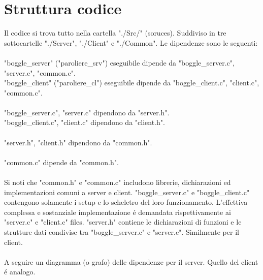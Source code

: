 \chapter{Struttura codice}

Il codice si trova tutto nella cartella "./Src/" (soruces). Suddiviso in tre sottocartelle "./Server", "./Client" e "./Common". Le dipendenze sono le seguenti:
\\
\\
"boggle\_server" ("paroliere\_srv") eseguibile dipende da "boggle\_server.c", "server.c", "common.c".
\\
"boggle\_client" ("paroliere\_cl") eseguibile dipende da "boggle\_client.c", "client.c", "common.c".
\\
\\
"boggle\_server.c", "server.c" dipendono da "server.h".
\\
"boggle\_client.c", "client.c" dipendono da "client.h".
\\
\\
"server.h", "client.h" dipendono da "common.h".
\\
\\
"common.c" dipende da "common.h".
\\
\\
Si noti che "common.h" e "common.c" includono librerie, dichiarazioni ed implementazioni comuni a server e client. "boggle\_server.c" e "boggle\_client.c" contengono solamente i setup e lo scheletro del loro funzionamento. L'effettiva complessa e sostanziale implementazione \'e demandata rispettivamente ai "server.c" e "client.c" files. "server.h" contiene le dichiarazioni di funzioni e le strutture dati condivise tra "boggle\_server.c" e "server.c". Similmente per il client.
\\
\\
A seguire un diagramma (o grafo) delle dipendenze per il server. Quello del client \'e analogo.


\usetikzlibrary{shapes,arrows,positioning}

